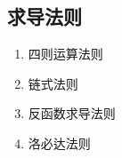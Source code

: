 \documentclass{article}
\begin{document}
\newpage

\subsection{求导法则}
\begin{enumerate}
    \item 四则运算法则
    \item 链式法则
    \item 反函数求导法则
    \item 洛必达法则
\end{enumerate}
\end{document}
